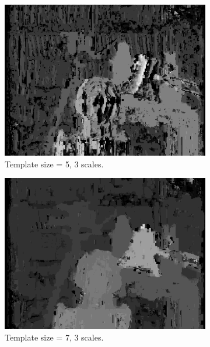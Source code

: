 \documentclass[12pt,a4paper,oneside,final]{article}
\begin{document}
\begin{figure}[H]
\ContinuedFloat
\begin{subfigure}[b]{0.24\textwidth}
	\includegraphics[width=\textwidth]{disparity_s3_k5.png}
	\caption{Template size = 5, 3 scales.}
\end{subfigure}
\begin{subfigure}[b]{0.24\textwidth}
	\includegraphics[width=\textwidth]{disparity_s3_k7.png}
	\caption{Template size = 7, 3 scales.}
\end{subfigure}
\begin{subfigure}[b]{0.24\textwidth}

\end{subfigure}
\end{figure}
\end{document}
